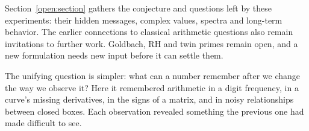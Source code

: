 Section~\ref{open:section} gathers the conjecture and questions left
by these experiments: their hidden messages, complex values, spectra
and long-term behavior.  The earlier connections to classical
arithmetic questions also remain invitations to further work.
Goldbach, RH and twin primes remain open, and a new formulation
needs new input before it can settle them.

The unifying question is simpler: what can a number remember after we
change the way we observe it? Here it remembered arithmetic in a digit
frequency, in a curve's missing derivatives, in the signs of a matrix,
and in noisy relationships between closed boxes. Each observation
revealed something the previous one had made difficult to see.
